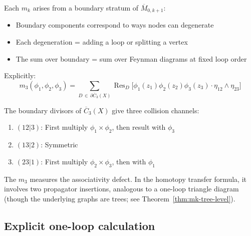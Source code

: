 \begin{evidence}
Each $m_k$ arises from a boundary stratum of $\overline{M}_{0,k+1}$:
\begin{itemize}
\item Boundary components correspond to ways nodes can degenerate
\item Each degeneration = adding a loop or splitting a vertex
\item The sum over boundary = sum over Feynman diagrams at fixed loop order
\end{itemize}

Explicitly:
\[m_3(\phi_1, \phi_2, \phi_3) = \sum_{D \,\in\, \partial \overline{C}_3(X)} \operatorname{Res}_D\bigl[\phi_1(z_1)\phi_2(z_2)\phi_3(z_3) \cdot \eta_{12} \wedge \eta_{23}\bigr]\]

The boundary divisors of $\overline{C}_3(X)$ give three collision channels:
\begin{enumerate}
\item $(12|3)$: First multiply $\phi_1 \times \phi_2$, then result with $\phi_3$
\item $(13|2)$: Symmetric
\item $(23|1)$: First multiply $\phi_2 \times \phi_3$, then with $\phi_1$
\end{enumerate}

The $m_3$ measures the associativity defect.  In the homotopy transfer formula, it involves two propagator insertions, analogous to a one-loop triangle diagram (though the underlying graphs are trees; see Theorem~\ref{thm:mk-tree-level}).
\end{evidence}

\subsection{Explicit one-loop calculation}

